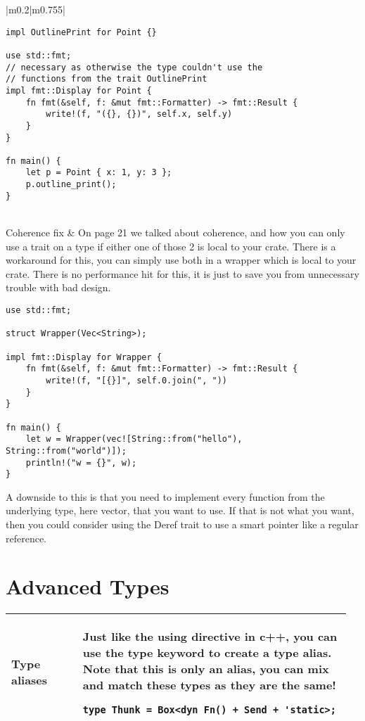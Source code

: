 \documentclass[main.tex,fontsize=8pt,paper=a4,paper=portrait,DIV=calc,]{scrartcl}
\begin{document}
\begin{table}[ht!]
\begin{tabular}{|m{0.2\linewidth}|m{0.755\linewidth}|}
\begin{lstlisting}
impl OutlinePrint for Point {}

use std::fmt;
// necessary as otherwise the type couldn't use the 
// functions from the trait OutlinePrint
impl fmt::Display for Point {
    fn fmt(&self, f: &mut fmt::Formatter) -> fmt::Result {
        write!(f, "({}, {})", self.x, self.y)
    }
}

fn main() {
    let p = Point { x: 1, y: 3 };
    p.outline_print();
}
\end{lstlisting}\\
\hline
Coherence fix & 
On page 21 we talked about coherence, and how you can only use a trait on a type if either one of those 2 is local to your crate.\newline
There is a workaround for this, you can simply use both in a wrapper which is local to your crate.\newline
There is no performance hit for this, it is just to save you from unnecessary trouble with bad design.\newline
\begin{lstlisting}
use std::fmt;

struct Wrapper(Vec<String>);

impl fmt::Display for Wrapper {
    fn fmt(&self, f: &mut fmt::Formatter) -> fmt::Result {
        write!(f, "[{}]", self.0.join(", "))
    }
}

fn main() {
    let w = Wrapper(vec![String::from("hello"), String::from("world")]);
    println!("w = {}", w);
}
\end{lstlisting} 
\textcolor{OliveGreen}{A downside to this is that you need to implement every function from the underlying type, here vector, that you want to use.\newline
If that is not what you want, then you could consider using the Deref trait to use a smart pointer like a regular reference.}\\
\hline
\end{tabular}
\section{Advanced Types}
\begin{tabular}{|m{0.2\linewidth}|m{0.755\linewidth}|}
\hline
Type aliases & 
Just like the using directive in c++, you can use the \textbf{type} keyword to create a type alias. \newline
Note that this is only an alias, you can mix and match these types as they are the same!\newline
\begin{lstlisting}
type Thunk = Box<dyn Fn() + Send + 'static>;
\end{lstlisting}\\
\hline
\end{tabular}
\end{table}
\end{document}
